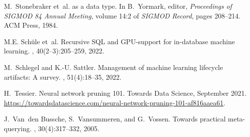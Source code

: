 \documentclass{article}
\begin{document}
\begin{thebibliography}{GSSVdB24}
M.~Stonebraker et~al.
 as a data type.
\newblock In B.~Yormark, editor, {\em Proceedings of SIGMOD 84 Annual Meeting},
  volume 14:2 of {\em SIGMOD Record}, pages 208--214. ACM Press, 1984.

M.E. Sch\"ule et~al.
\newblock Recursive {SQL} and {GPU}-support for in-database machine learning.
, 40(2--3):205--259, 2022.

M.~Schlegel and K.-U. Sattler.
\newblock Management of machine learning lifecycle artifacts: A survey.
, 51(4):18--35, 2022.

H.~Tessier.
\newblock Neural network pruning 101.
\newblock Towards Data Science, September 2021.
\newblock
  \url{https://towardsdatascience.com/neural-network-pruning-101-af816aaea61}.

J.~Van~den Bussche, S.~Vansummeren, and G.~Vossen.
\newblock Towards practical meta-querying.
, 30(4):317--332, 2005.

\end{thebibliography}
\end{document}
